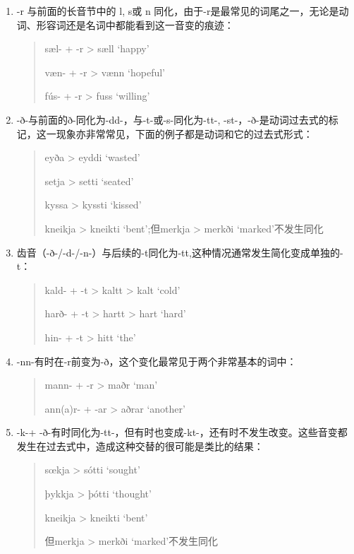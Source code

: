 \begin{enumerate}

  \item
        \label{_Ref117517668}{}-r 与前面的长音节中的 l, s或 n
        同化，由于-r是最常见的词尾之一，无论是动词、形容词还是名词中都能看到这一音变的痕迹：
        \begin{quote}
          sæl- + -r > sæll `happy'

          væn- + -r > vænn `hopeful'

          fús- + -r > fuss `willing'
        \end{quote}

  \item
        -ð-与前面的ð-同化为-dd-，与-t-或-s-同化为-tt-,
        -st-，-ð-是动词过去式的标记，这一现象亦非常常见，下面的例子都是动词和它的过去式形式：
        \begin{quote}
          eyða > eyddi `wasted'

          setja > setti `seated'

          kyssa > kyssti `kissed'

          kneikja > kneikti `bent';但merkja > merkði
          `marked'不发生同化
        \end{quote}

  \item
        齿音（-ð-/-d-/-n-）与后续的-t同化为-tt,这种情况通常发生简化变成单独的-t：
        \begin{quote}
          kald- + -t > kaltt > kalt `cold'

          harð- + -t > hartt > hart `hard'

          hin- + -t > hitt `the'
        \end{quote}


  \item
        -nn-有时在-r前变为-ð，这个变化最常见于两个非常基本的词中：
        \begin{quote}
          mann- + -r > maðr `man'

          ann(a)r- + -ar > aðrar `another'
        \end{quote}

  \item
        -k-+
        -ð-有时同化为-tt-，但有时也变成-kt-，还有时不发生改变。这些音变都发生在过去式中，造成这种交替的很可能是类比的结果：
        \begin{quote}
          sœkja > sótti `sought'

          þykkja > þótti `thought'

          kneikja > kneikti `bent'

          但merkja > merkði `marked'不发生同化
        \end{quote}
\end{enumerate}


